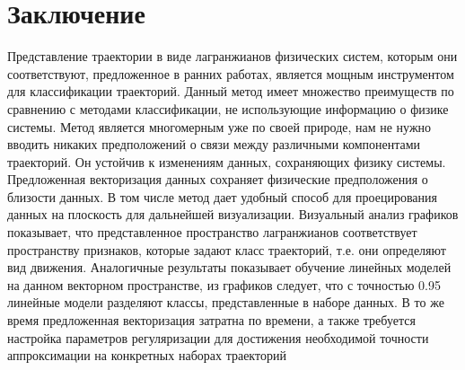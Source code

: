 \documentclass[a4paper, 12pt]{article}
\begin{document}
\newpage
\section{Заключение}

Представление траектории в виде лагранжианов физических систем, которым они соответствуют, предложенное в ранних работах, является мощным инструментом для классификации траекторий. Данный метод имеет множество преимуществ по сравнению с методами классификации, не использующие информацию о физике системы. Метод является многомерным уже по своей природе, нам не нужно вводить никаких предположений о связи между различными компонентами траекторий. Он устойчив к изменениям данных, сохраняющих физику системы. Предложенная векторизация данных сохраняет физические предположения о близости данных. В том числе метод дает удобный способ для проецирования данных на плоскость для дальнейшей визуализации. Визуальный анализ графиков показывает, что представленное пространство лагранжианов соответствует пространству признаков, которые задают класс траекторий, т.е. они определяют вид движения. Аналогичные результаты показывает обучение линейных моделей на данном векторном пространстве, из графиков следует, что с точностью 0.95 линейные модели разделяют классы, представленные в наборе данных.  В то же время предложенная векторизация затратна по времени, а также требуется настройка параметров регуляризации для достижения необходимой точности аппроксимации на конкретных наборах траекторий

\newpage
	
	
	
	
\end{document}
